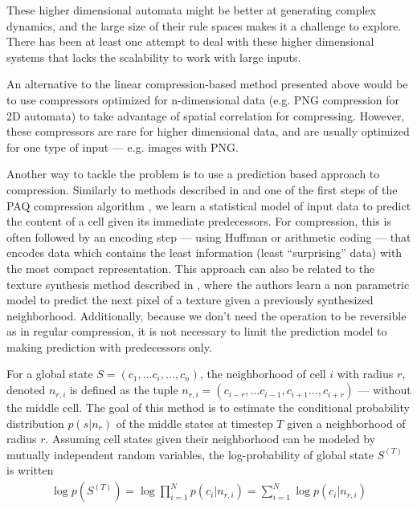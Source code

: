 These higher dimensional automata might be better at generating complex
dynamics, and the large size of their rule spaces makes it a challenge to
explore. There has been at least one attempt to deal with these higher
dimensional systems \parencite{zenil_two-dimensional_2015} that lacks the scalability
to work with large inputs.

An alternative to the linear compression-based method presented above would be
to use compressors optimized for n-dimensional data (e.g. PNG compression for 2D
automata) to take advantage of spatial correlation for compressing. However,
these compressors are rare for higher dimensional data, and are usually
optimized for one type of input --- e.g. images with PNG.

Another way to tackle the problem is to use a prediction based approach to
compression. Similarly to methods described in
\parencite{schmidhuber_sequential_1996} and one of the first steps of the PAQ
compression algorithm \parencite{mahoney_fast_2000}, we learn a statistical model of
input data to predict the content of a cell given its immediate predecessors.
For compression, this is often followed by an encoding step --- using Huffman or
arithmetic coding --- that encodes data which contains the least information
(least ``surprising'' data) with the most compact representation. This approach
can also be related to the texture synthesis method described in
\parencite{efros_texture_1999}, where the authors learn a non parametric model to
predict the next pixel of a texture given a previously synthesized neighborhood.
Additionally, because we don't need the operation to be reversible as in regular
compression, it is not necessary to limit the prediction model to making
prediction with predecessors only.

For a global state $S = (c_{1}, ... c_i, ..., c_{n})$, the neighborhood of cell
$i$ with radius $r$, denoted $n_{r,i}$ is defined as the tuple $n_{r,i} =
(c_{i-r}, ... c_{i-1}, c_{i+1} ..., c_{i+r})$ --- without the middle cell. The
goal of this method is to estimate the conditional probability distribution $p(s
| n_r)$ of the middle states at timestep $T$ given a neighborhood of radius $r$.
Assuming cell states given their neighborhood can be modeled by mutually
independent random variables, the log-probability of global state $S^{(T)}$ is
written
\begin{align}
  \textstyle \log p(S^{(T)}) = \log \prod_{i=1}^N p(c_i | n_{r,i})  =
  \sum_{i=1}^N \log  p(c_i | n_{r,i})
\end{align}

